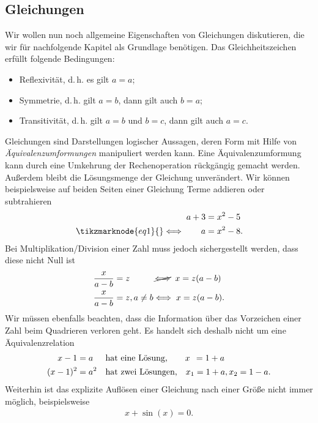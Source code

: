 \subsection{Gleichungen}
Wir wollen nun noch allgemeine Eigenschaften von Gleichungen diskutieren, die wir für nachfolgende Kapitel als Grundlage benötigen. Das Gleichheitszeichen erfüllt folgende Bedingungen:
\begin{itemize}
    \item Reflexivität, d.\,h. es gilt $a = a$;
    \item Symmetrie, d.\,h. gilt $a= b$, dann gilt auch $b=a$;
    \item Transitivität, d.\,h. gilt $a=b$ und $b=c$, dann gilt auch $a=c$.
\end{itemize}
Gleichungen sind Darstellungen logischer Aussagen, deren Form mit Hilfe von \emph{Äquivalenzumformungen} manipuliert werden kann. Eine Äquivalenzumformung kann durch eine Umkehrung der Rechenoperation rückgängig gemacht werden. Außerdem bleibt die Lösungsmenge der Gleichung unverändert. Wir können beispielsweise auf beiden Seiten einer Gleichung Terme addieren oder subtrahieren
\begin{align}
    a+3 &= x^2 - 5 \notag \\
    \tikzmarknode{eq1}{}\Longleftrightarrow\qquad a&= x^2 - 8.
\end{align}
Bei Multiplikation/Division einer Zahl muss jedoch sichergestellt werden, dass diese nicht Null ist 
\begin{align}
    \begin{split}
        \frac{x}{a-b} &= z\hphantom{, a\neq b} \,\cancel{\Longleftrightarrow}\;\; x = z(a-b)\\
        \frac{x}{a-b} &= z, a\neq b \Longleftrightarrow\;  x = z(a-b).
    \end{split}
\end{align}
Wir müssen ebenfalls beachten, dass die Information über das Vorzeichen einer Zahl beim Quadrieren verloren geht. Es handelt sich deshalb nicht um eine Äquivalenzrelation 
\begin{align}
    \begin{split}
        x-1 &= a\hphantom{^2} \qq{hat eine Lösung,}\hphantom{en} x\hphantom{_1}=1+a \\
        (x-1)^2 &= a^2 \qq{hat zwei Lösungen,} x_1=1+a, x_2 =1-a.
    \end{split}
\end{align}
Weiterhin ist das explizite Auflösen einer Gleichung nach einer Größe nicht immer möglich, beispielsweise 
\begin{align}
    x + \sin(x) = 0.
\end{align}